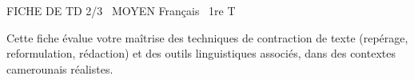 \documentclass[11pt]{article}
\begin{document}
\begin{tcolorbox}[enhanced,colback=popink,colframe=popink,arc=10pt,boxrule=0pt,left=12pt,right=12pt,top=9pt,bottom=9pt]
{\color{white}\popxbold\small FICHE DE TD 2/3 \textbullet\ MOYEN \hfill Français \textbullet\ 1re T\par}
\end{tcolorbox}
\vspace{4pt}
Cette fiche évalue votre maîtrise des techniques de contraction de texte (repérage, reformulation, rédaction) et des outils linguistiques associés, dans des contextes camerounais réalistes.
\end{document}
